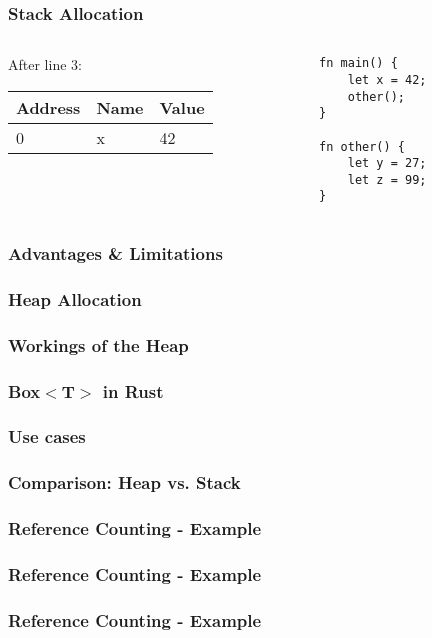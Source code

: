 \documentclass{beamer}
\begin{document}
\begin{frame}[fragile]
	\frametitle{Stack Allocation}
	\begin{columns}[T, c]
		\begin{column}{0.48\textwidth}
			After line 3:
			\begin{tabular}{| l | l | l |}
				\hline
				Address & Name & Value \\ \hline
				0 & x & 42 \\ \hline
			\end{tabular}
		\end{column}
		\begin{column}{0.48\textwidth}
			\begin{verbatim}
fn main() {
	let x = 42;
	other();
}

fn other() {
	let y = 27;
	let z = 99;
}
			\end{verbatim}
		\end{column}
	\end{columns}
\end{frame}
\begin{frame}
	\frametitle{Advantages \& Limitations}
\end{frame}
\begin{frame}
	\frametitle{Heap Allocation}
\end{frame}
\begin{frame}
	\frametitle{Workings of the Heap}
\end{frame}
\begin{frame}
	\frametitle{Box$<$T$>$ in Rust}
\end{frame}
\begin{frame}
	\frametitle{Use cases}
\end{frame}
\begin{frame}
	\frametitle{Comparison: Heap vs. Stack}
\end{frame}
\begin{frame}
	\frametitle{Reference Counting - Example}
	\begin{figure}
		\def\svgwidth{230pt}
		\huge
		
	\end{figure}
\end{frame}
\begin{frame}
	\frametitle{Reference Counting - Example}
	\begin{figure}
		\def\svgwidth{230pt}
		\huge
		
	\end{figure}
\end{frame}
\begin{frame}
	\frametitle{Reference Counting - Example}
	\begin{figure}
		\def\svgwidth{230pt}
		\huge
		
	\end{figure}
\end{frame}
\end{document}
